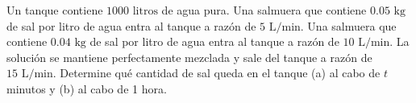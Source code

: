 \item Un tanque contiene $1000 \text{ litros}$ de agua pura. Una salmuera que contiene $0.05 \text{ kg}$ de sal por litro de agua entra al tanque a razón de $5 \text{ L/min}$. Una salmuera que contiene $0.04 \text{ kg}$ de sal por litro de agua entra al tanque a razón de $10 \text{ L/min}$. La solución se mantiene perfectamente mezclada y sale del tanque a razón de $15 \text{ L/min}$. Determine qué cantidad de sal queda en el tanque (a) al cabo de $t$ minutos y (b) al cabo de 1 hora.
